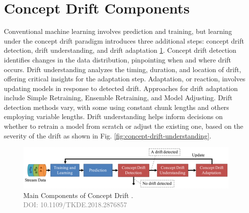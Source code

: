  \section{Concept Drift Components}
\label{sec:background_concept_drift_components}
Conventional machine learning involves prediction and training, but learning under the concept drift paradigm introduces three additional steps: concept drift detection, drift understanding, and drift adaptation \ref{fig:concept-drift-components}. Concept drift detection identifies changes in the data distribution, pinpointing when and where drift occurs. Drift understanding analyzes the timing, duration, and location of drift, offering critical insights for the adaptation step. Adaptation, or reaction, involves updating models in response to detected drift. Approaches for drift adaptation include Simple Retraining, Ensemble Retraining, and Model Adjusting. Drift detection methods vary, with some using constant chunk lengths and others employing variable lengths. Drift understanding helps inform decisions on whether to retrain a model from scratch or adjust the existing one, based on the severity of the drift as shown in Fig. \ref{fig:concept-drift-understanding}.
\vspace{-3mm}

\begin{figure}[!ht]
    \centering
    \includegraphics[width=.9\textwidth]{2_Background/figures/concept_drift_components.png}
    \caption{Main Components of Concept Drift \cite{8496795}. \\ \textcolor{gray}{\fontsize{10}{0}\selectfont DOI: 10.1109/TKDE.2018.2876857}}

    \label{fig:concept-drift-components}
\end{figure}
\vspace{-6mm}


